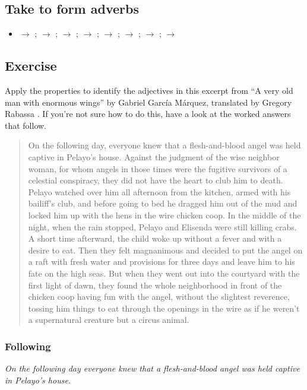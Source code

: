 \subsection{Take  to form adverbs}
\begin{itemize}[noitemsep]
    \item {} $\rightarrow$ ;  $\rightarrow$ ;  $\rightarrow$ ;  $\rightarrow$ ;  $\rightarrow$ ;  $\rightarrow$ ;  $\rightarrow$ ;  $\rightarrow$ 
\end{itemize}

\subsection{Exercise}
Apply the properties to identify the adjectives in this excerpt from \enquote{A very old man with enormous wings} by Gabriel García Márquez, translated by Gregory Rabassa \citep{GarciaMarquez1972VeryOldMan}. If you're not sure how to do this, have a look at the worked answers that follow.
\begin{quote}
On the following day, everyone knew that a flesh-and-blood angel was held captive in Pelayo's house. Against the judgment of the wise neighbor woman, for whom angels in those times were the fugitive survivors of a celestial conspiracy, they did not have the heart to club him to death. Pelayo watched over him all afternoon from the kitchen, armed with his bailiff's club, and before going to bed he dragged him out of the mud and locked him up with the hens in the wire chicken coop. In the middle of the night, when the rain stopped, Pelayo and Elisenda were still killing crabs. A short time afterward, the child woke up without a fever and with a desire to eat. Then they felt magnanimous and decided to put the angel on a raft with fresh water and provisions for three days and leave him to his fate on the high seas. But when they went out into the courtyard with the first light of dawn, they found the whole neighborhood in front of the chicken coop having fun with the angel, without the slightest reverence, tossing him things to eat through the openings in the wire as if he weren't a supernatural creature but a circus animal.
\end{quote}

\subsubsection*{Following}
\textit{On the \emph{following} day everyone knew that a flesh-and-blood angel was held captive in Pelayo's house.}

